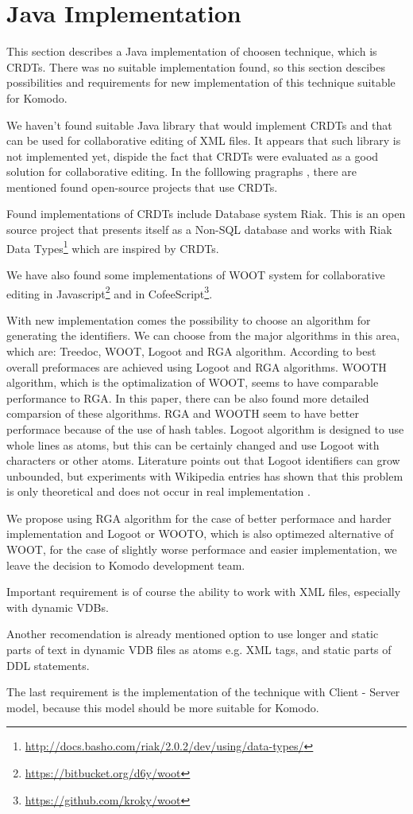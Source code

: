 \documentclass[12pt,oneside]{fithesis2}
\begin{document}
\section{Java Implementation}
\par This section describes a Java implementation of choosen technique, which is CRDTs. There was no suitable implementation found, so this section descibes possibilities and requirements for new implementation of this technique suitable for Komodo. 
\par We haven't found suitable Java library that would implement CRDTs and that can be used for collaborative editing of XML files. It appears that such library is not implemented yet, dispide the fact that CRDTs were evaluated as a good solution for collaborative editing. In the folllowing pragraphs , there are mentioned found open-source projects that use CRDTs. 
\par Found implementations of CRDTs include Database system Riak. This is an open source project that presents itself as a Non-SQL database and works with Riak Data Types\footnote{\url{http://docs.basho.com/riak/2.0.2/dev/using/data-types/}} which are inspired by CRDTs.
\par We have also found some implementations of WOOT system for collaborative editing in Javascript\footnote{\url{https://bitbucket.org/d6y/woot}} and in CofeeScript\footnote{\url{https://github.com/kroky/woot}}.
\par With new implementation comes the possibility to choose an algorithm for generating the identifiers. We can choose from the major algorithms in this area, which are: Treedoc, WOOT, Logoot and RGA algorithm. According to \cite{CRDT-real} best overall preformaces are achieved using Logoot and RGA algorithms. WOOTH algorithm, which is the optimalization of WOOT, seems to have comparable performance to RGA. In this paper, there can be also found more detailed comparsion of these algorithms. RGA and WOOTH seem to have better performace because of the use of hash tables. Logoot algorithm is designed to use whole lines as atoms, but this can be certainly changed and use Logoot with characters or other atoms. Literature points out that Logoot identifiers can grow unbounded, but  experiments with Wikipedia entries has shown that this problem is only theoretical and does not occur in real implementation \cite{Logoot2}.
\par We propose using RGA algorithm for the case of better performace and harder implementation and Logoot or WOOTO, which is also optimezed alternative of WOOT, for the case of slightly worse performace and easier implementation, we leave the decision to Komodo development team.
\par Important requirement is of course the ability to work with XML files, especially with dynamic VDBs.
\par Another recomendation is already mentioned option to use longer and static parts of text in dynamic VDB files as atoms e.g. XML tags, and static parts of DDL statements.
\par The last requirement is the implementation of the technique with Client - Server model, because this model should be more suitable for Komodo.
\end{document}
